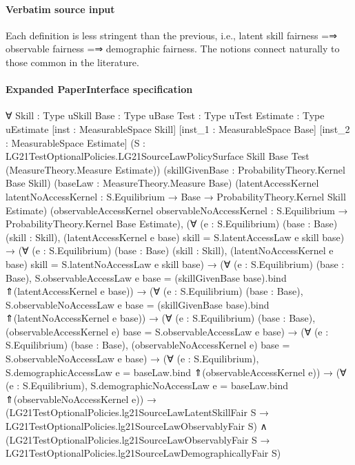 \documentclass[10pt]{article}
\begin{document}
\paragraph{Verbatim source input}
\begin{ReviewVerbatim}
Each deﬁnition is less stringent than the previous, i.e., latent skill fairness =⇒ observable fairness =⇒ demographic fairness. The notions connect naturally to those common in the literature.
\end{ReviewVerbatim}



\paragraph{Expanded PaperInterface specification}
\begin{ReviewVerbatim}
∀ {Skill : Type uSkill} {Base : Type uBase} {Test : Type uTest} {Estimate : Type uEstimate}
  [inst : MeasurableSpace Skill] [inst_1 : MeasurableSpace Base] [inst_2 : MeasurableSpace Estimate]
  (S : LG21TestOptionalPolicies.LG21SourceLawPolicySurface Skill Base Test (MeasureTheory.Measure Estimate))
  (skillGivenBase : ProbabilityTheory.Kernel Base Skill) (baseLaw : MeasureTheory.Measure Base)
  (latentAccessKernel latentNoAccessKernel : S.Equilibrium → Base → ProbabilityTheory.Kernel Skill Estimate)
  (observableAccessKernel observableNoAccessKernel : S.Equilibrium → ProbabilityTheory.Kernel Base Estimate),
  (∀ (e : S.Equilibrium) (base : Base) (skill : Skill),
      (latentAccessKernel e base) skill = S.latentAccessLaw e skill base) →
    (∀ (e : S.Equilibrium) (base : Base) (skill : Skill),
        (latentNoAccessKernel e base) skill = S.latentNoAccessLaw e skill base) →
      (∀ (e : S.Equilibrium) (base : Base),
          S.observableAccessLaw e base = (skillGivenBase base).bind ⇑(latentAccessKernel e base)) →
        (∀ (e : S.Equilibrium) (base : Base),
            S.observableNoAccessLaw e base = (skillGivenBase base).bind ⇑(latentNoAccessKernel e base)) →
          (∀ (e : S.Equilibrium) (base : Base), (observableAccessKernel e) base = S.observableAccessLaw e base) →
            (∀ (e : S.Equilibrium) (base : Base), (observableNoAccessKernel e) base = S.observableNoAccessLaw e base) →
              (∀ (e : S.Equilibrium), S.demographicAccessLaw e = baseLaw.bind ⇑(observableAccessKernel e)) →
                (∀ (e : S.Equilibrium), S.demographicNoAccessLaw e = baseLaw.bind ⇑(observableNoAccessKernel e)) →
                  (LG21TestOptionalPolicies.lg21SourceLawLatentSkillFair S →
                      LG21TestOptionalPolicies.lg21SourceLawObservablyFair S) ∧
                    (LG21TestOptionalPolicies.lg21SourceLawObservablyFair S →
                      LG21TestOptionalPolicies.lg21SourceLawDemographicallyFair S)
\end{ReviewVerbatim}
\end{document}
